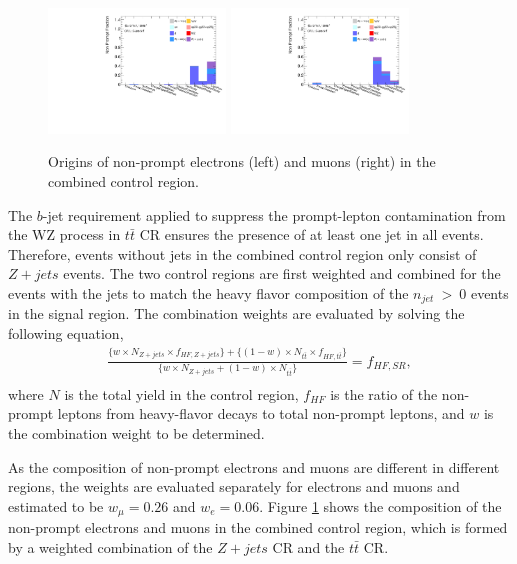 \begin{figure}[!htb]
        \centering
        \includegraphics[width = 0.42\textwidth]{figures/Analysis/Background/NonPromptComposition_Combined_Electrons.pdf}
        \includegraphics[width = 0.42\textwidth]{figures/Analysis/Background/NonPromptComposition_Combined_Muons.pdf}
        \caption{ Origins of non-prompt electrons (left) and muons (right) in the combined control region. \label{fig:NonPromptCombined}}
\end{figure}

The $b$-jet requirement applied to suppress the prompt-lepton contamination from the WZ process in $t\bar{t}$ CR ensures the presence of at least one jet in all events. Therefore, events without jets in the combined control region only consist of $Z+jets$ events. The two control regions are first weighted and combined for the events with the jets to match the heavy flavor composition of the $n_{jet}~>~0$ events in the signal region. The combination weights are evaluated by solving the following equation,
\begin{equation}
\begin{aligned}
\frac{\{w \times N_{Z+jets} \times f_{HF, Z+jets}\} + \{ (1-w) \times N_{t\bar{t}} \times f_{HF, t\bar{t}}\}}{\{w \times N_{Z+jets} + (1-w) \times N_{t\bar{t}} \}} = f_{HF, SR},\\
\end{aligned}
\end{equation}
where $N$ is the total yield in the control region, $ f_{HF}$ is the ratio of the non-prompt leptons from heavy-flavor decays to total non-prompt leptons, and $w$ is the combination weight to be determined.

As the composition of non-prompt electrons and muons are different in different regions, the weights are evaluated separately for electrons and muons and estimated to be $w_{\mu} = 0.26$ and $w_{e} = 0.06$. Figure \ref{fig:NonPromptCombined} shows the composition of the non-prompt electrons and muons in the combined control region, which is formed by a weighted combination of the $Z+jets$ CR and the $t\bar{t}$ CR.

